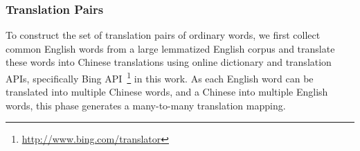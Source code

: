 %
%
%

\subsubsection{Translation Pairs}

%
%
To construct the set of translation pairs of ordinary words, we first collect common
English words from a large lemmatized English corpus and translate
these words into Chinese translations using online
dictionary and translation APIs,
specifically Bing
API~\footnote{\url{http://www.bing.com/translator}} in this work. As each English word can be translated into multiple Chinese words, and a Chinese into multiple English words, this phase generates
a many-to-many translation mapping.

